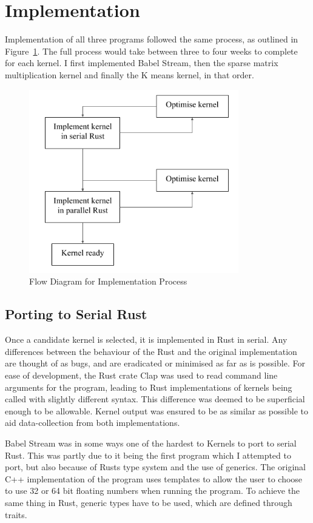 \section{Implementation}
Implementation of all three programs followed the same process, as outlined in Figure~\ref{fig:imp-flow}. The full process would take between three to four weeks to complete for each kernel. I first implemented Babel Stream, then the sparse matrix multiplication kernel and finally the K means kernel, in that order.

\begin{figure}
  \center
  \includegraphics[height=8cm]{figs/ImplementationFlow.png}
  \caption{Flow Diagram for Implementation Process}
  \label{fig:imp-flow}
\end{figure}

\subsection{Porting to Serial Rust}
Once a candidate kernel is selected, it is implemented in Rust in serial. Any differences between the  behaviour of the Rust and the original implementation are thought of as bugs, and are eradicated or minimised as far as is possible. For ease of development, the Rust crate Clap was used to read command line arguments for the program, leading to Rust implementations of kernels being called with slightly different syntax. This difference was deemed to be superficial enough to be allowable. Kernel output was ensured to be as similar as possible to aid data-collection from both implementations.

Babel Stream was in some ways one of the hardest to Kernels to port to serial Rust. This was partly due to it being the first program which I attempted to port, but also because of Rusts type system and the use of generics. The original C++ implementation of the program uses templates to allow the user to choose to use 32 or 64 bit floating numbers when running the program. To achieve the same thing in Rust, generic types have to be used, which are defined through traits.

